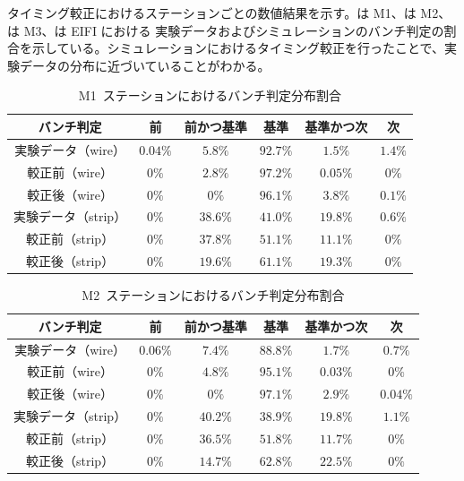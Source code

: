 タイミング較正におけるステーションごとの数値結果を示す。は M1、は M2、は M3、は EIFI における 実験データおよびシミュレーションのバンチ判定の割合を示している。シミュレーションにおけるタイミング較正を行ったことで、実験データの分布に近づいていることがわかる。
\begin{table}[htb]
	\centering
	\begin{tabular}{c|c|c|c|c|c}\hline
	バンチ判定&前&前かつ基準&基準&基準かつ次&次 \\ \hline\hline
	実験データ（wire）& $0.04\%$ & $5.8\%$ & $92.7\%$ & $1.5\%$ & $1.4\%$ \\
	較正前（wire）& $0\%$ & $2.8\%$ & $97.2\%$ & $0.05\%$ & $0\%$ \\ 
	較正後（wire）& $0\%$ & $0\%$ & $96.1\%$ & $3.8\%$ & $0.1\%$ \\ \hline
	実験データ（strip）& $0\%$ & $38.6\%$ & $41.0\%$ & $19.8\%$ & $0.6\%$ \\
	較正前（strip）& $0\%$ & $37.8\%$ & $51.1\%$ & $11.1\%$ & $0\%$ \\
	較正後（strip）& $0\%$ & $19.6\%$ & $61.1\%$ & $19.3\%$ & $0\%$ \\
	\end{tabular}
	\caption{M1~ステーションにおけるバンチ判定分布割合}\label{tb:tunebcidM1}
\end{table}

\begin{table}[htb]
	\centering
	\begin{tabular}{c|c|c|c|c|c}\hline
	バンチ判定&前&前かつ基準&基準&基準かつ次&次 \\ \hline\hline
	実験データ（wire）& $0.06\%$ & $7.4\%$ & $88.8\%$ & $1.7\%$ & $0.7\%$ \\
	較正前（wire）& $0\%$ & $4.8\%$ & $95.1\%$ & $0.03\%$ & $0\%$ \\ 
	較正後（wire）& $0\%$ & $0\%$ & $97.1\%$ & $2.9\%$ & $0.04\%$ \\ \hline
	実験データ（strip）& $0\%$ & $40.2\%$ & $38.9\%$ & $19.8\%$ & $1.1\%$ \\
	較正前（strip）& $0\%$ & $36.5\%$ & $51.8\%$ & $11.7\%$ & $0\%$ \\
	較正後（strip）& $0\%$ & $14.7\%$ & $62.8\%$ & $22.5\%$ & $0\%$ \\
	\end{tabular}
	\caption{M2~ステーションにおけるバンチ判定分布割合}\label{tb:tunebcidM2}
\end{table}


